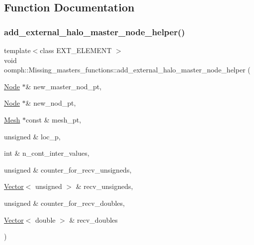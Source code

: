 \subsection{Function Documentation}
\mbox{\label{namespaceoomph_1_1Missing__masters__functions_a9e3bf04e14473cd6671c5b1f17bc4823}} 
\subsubsection{\texorpdfstring{add\+\_\+external\+\_\+halo\+\_\+master\+\_\+node\+\_\+helper()}{add\_external\_halo\_master\_node\_helper()}}
{\footnotesize\ttfamily template$<$class E\+X\+T\+\_\+\+E\+L\+E\+M\+E\+NT $>$ \\
void oomph\+::\+Missing\+\_\+masters\+\_\+functions\+::add\+\_\+external\+\_\+halo\+\_\+master\+\_\+node\+\_\+helper (\begin{DoxyParamCaption}\item[{\hyperlink{classoomph_1_1Node}{Node} $\ast$\&}]{new\+\_\+master\+\_\+nod\+\_\+pt,  }\item[{\hyperlink{classoomph_1_1Node}{Node} $\ast$\&}]{new\+\_\+nod\+\_\+pt,  }\item[{\hyperlink{classoomph_1_1Mesh}{Mesh} $\ast$const \&}]{mesh\+\_\+pt,  }\item[{unsigned \&}]{loc\+\_\+p,  }\item[{int \&}]{n\+\_\+cont\+\_\+inter\+\_\+values,  }\item[{unsigned \&}]{counter\+\_\+for\+\_\+recv\+\_\+unsigneds,  }\item[{\hyperlink{classoomph_1_1Vector}{Vector}$<$ unsigned $>$ \&}]{recv\+\_\+unsigneds,  }\item[{unsigned \&}]{counter\+\_\+for\+\_\+recv\+\_\+doubles,  }\item[{\hyperlink{classoomph_1_1Vector}{Vector}$<$ double $>$ \&}]{recv\+\_\+doubles }\end{DoxyParamCaption})}



